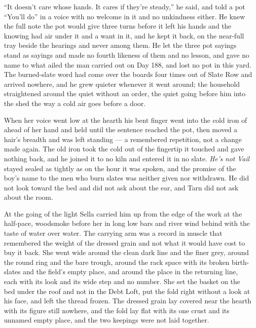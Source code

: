 “It doesn't care whose hands. It cares if they're steady,” he said, and told a pot “You'll do” in a voice with no welcome in it and no unkindness either. He knew the full note the pot would give three turns before it left his hands and the knowing had air under it and a want in it, and he kept it back, on the near-full tray beside the hearings and never among them. He let the three pot sayings stand as sayings and made no fourth likeness of them and no lesson, and gave no name to what ailed the man carried out on Day 188, and lost no pot in this yard. The burned-slate word had come over the boards four times out of Slate Row and arrived nowhere, and he grew quieter whenever it went around; the household straightened around the quiet without an order, the quiet going before him into the shed the way a cold air goes before a door.

When her voice went low at the hearth his bent finger went into the cold iron of  ahead of her hand and held until the sentence reached the pot, then moved a hair's breadth and was left standing --- a remembered repetition, not a change made again. The old iron took the cold out of the fingertip it touched and gave nothing back, and he joined it to no kiln and entered it in no slate. \emph{He's not Vail} stayed sealed as tightly as on the hour it was spoken, and the promise of the boy's name to the men who burn slates was neither given nor withdrawn. He did not look toward the bed and did not ask about the ear, and Tarn did not ask about the room.

\scenebreak

At the going of the light Sella carried him up from the edge of the work at the half-pace, woodsmoke before her in long low bars and river wind behind with the taste of water over water. The carrying arm was a record in muscle that remembered the weight of the dressed grain and not what it would have cost to buy it back. She went wide around the clean dark line and the finer grey, around the round ring and the bare trough, around the rack space with its broken birth-slates and the field's empty place, and around the place in the returning line, each with its look and its wide step and no number. She set the basket on the bed under the roof and not in the Debt Loft, put the fold right without a look at his face, and left the thread frozen. The dressed grain lay covered near the hearth with its figure still nowhere, and the fold lay flat with its one crust and its unnamed empty place, and the two keepings were not laid together.

